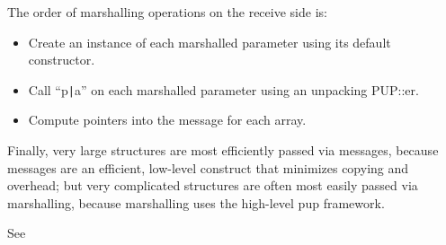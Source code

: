 The order of marshalling operations on the receive side is:
\begin{itemize}
\item Create an instance of each marshalled parameter using its default constructor.
\item Call ``p\verb.|.a'' on each marshalled parameter using an unpacking PUP::er.
\item Compute pointers into the message for each array.
\end{itemize}

Finally, very large structures are most efficiently passed via messages,
because messages are an efficient, low-level construct that minimizes copying
and overhead; but very complicated structures are often most easily passed via 
marshalling, because marshalling uses the high-level pup framework.

See 

